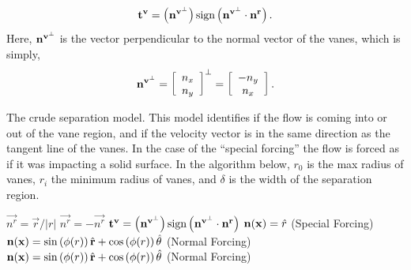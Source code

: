 \begin{equation}
 \bf t^v = \left( {\bf n^{v^\perp}} \right) \text{sign}\left(
	    {\bf n^{v^\perp}} \cdot {\bf n^r} \right).
\end{equation}
Here, ${\bf n^{v^\perp}}$ is the vector perpendicular to the normal
vector of the vanes, which is simply, 
\begin{equation*}
 {\bf n^{v^\perp}} = \left[ \begin{array}{c}
n_x\\
n_y\\
\end{array}\right]^{\perp} = 
 \left[ \begin{array}{c}
  -n_y\\
  n_x\\
	\end{array}\right].
\end{equation*}

%
%
\begin{center}
 \begin{algorithm}
  \caption{The crude separation model. This model identifies if the flow
  is coming into or out of the vane region, and if the velocity vector
  is in the same direction as the tangent line of the vanes. In the case
  of the ``special forcing'' the flow is forced as if it was
  impacting a solid surface. In the
  algorithm below, $r_0$ is the max radius of vanes, $r_i$ the minimum
  radius of vanes, and $\delta$ is the width of the separation region.}
  \label{alg:sep}
  \begin{algorithmic}[1]
   \State $\overrightarrow{n^r} = \overrightarrow{r}/|r|$
   \State $\overrightarrow{n^r} = -\overrightarrow{n^r}$
   \EndIf
   \State  $\bf t^v = \left( {\bf n^{v^\perp}} \right) \text{sign}\left(
	    {\bf n^{v^\perp}} \cdot {\bf n^r} \right)$
   \State ${\bf n}({\bf x}) = \hat r$ \quad (Special Forcing)
   \Else
   \State  ${\bf n}({\bf x}) = \sin \left(\phi(r) \right) \hat{{\bf r}}+ \cos
  \left(\phi(r) \right) \hat{{\bf \theta}} $
  \quad (Normal Forcing)
   \EndIf
   \Else
   \State ${\bf n}({\bf x}) = \sin \left(\phi(r) \right) \hat{{\bf r}}+ \cos
  \left(\phi(r) \right) \hat{{\bf \theta}} $
  \quad (Normal Forcing)
   \EndIf
   \EndIf
  \end{algorithmic}
 \end{algorithm}
\end{center}
%

